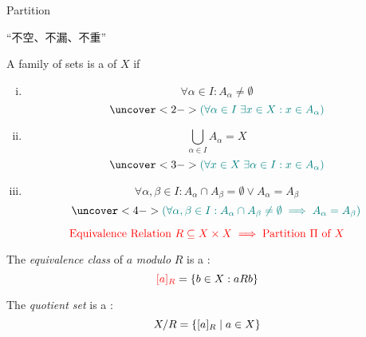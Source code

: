 \begin{frame}{}
  \centerline{\LARGE Partition}

  \vspace{0.60cm}

  \begin{center}
    ``不空、不漏、不重''
  \end{center}
\end{frame}

\begin{frame}{}
  \begin{definition}[Partition]
    A family of sets  is a  of $X$ if

    \begin{enumerate}[(i)]
      \item 
	\[
	  \forall \alpha \in I: A_{\alpha} \neq \emptyset
	\]
	\[
	  \uncover<2->{\teal{(\forall \alpha \in I \; \exists x \in X: x \in A_{\alpha})}}
	\]
      \item 
	\[
	  \bigcup_{\alpha \in I} A_{\alpha} = X
	\]
	\[
	  \uncover<3->{\teal{(\forall x \in X \; \exists \alpha \in I: x \in A_{\alpha})}}
	\]
      \item 
	\[
	  \forall \alpha, \beta \in I: A_{\alpha} \cap A_{\beta} = \emptyset \lor A_{\alpha} = A_{\beta}
	\]
	\[
	  \uncover<4->{\teal{(\forall \alpha, \beta \in I: A_{\alpha} \cap A_{\beta} \neq \emptyset \implies A_{\alpha} = A_{\beta})}}
	\]
    \end{enumerate}
  \end{definition}
\end{frame}

\begin{frame}{}
  \[
    \textcolor{red}{\text{Equivalence Relation } R \subseteq X \times X \implies \text{Partition } \Pi \text{ of } X}
  \]

  \pause
  \begin{definition}
    The {\it equivalence class} of $a$ {\it modulo} $R$ is a :
    \[
      \textcolor{red}{[a]_{R}} = \{b \in X: a R b\}
    \]
  \end{definition}

  \pause
  \vspace{0.60cm}
  \begin{definition}
    The {\it quotient set} is a :
    \[
      X/R = \{[a]_{R} \mid a \in X\}
    \]
  \end{definition}
\end{frame}


